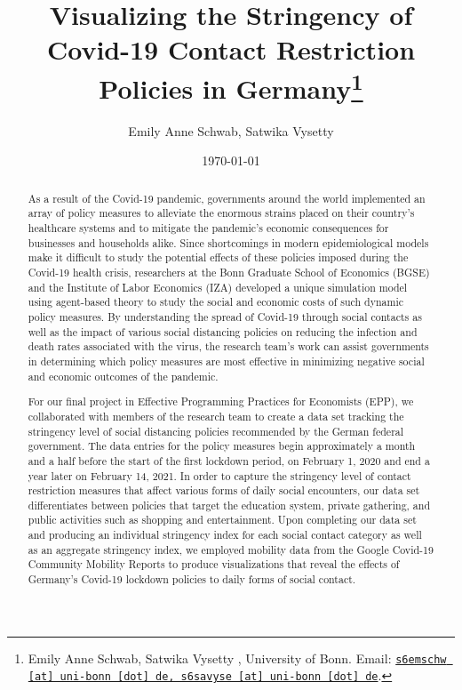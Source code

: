 \documentclass[11pt, a4paper, leqno]{article}
\begin{document}
\title{\bf{Visualizing the Stringency of Covid-19 Contact Restriction Policies in Germany}\thanks{Emily Anne Schwab, Satwika Vysetty , University of Bonn. Email: \href{mailto:s6emschw@uni-bonn.de, s6savyse@uni-bonn.de}{\nolinkurl{s6emschw [at] uni-bonn [dot] de, s6savyse [at] uni-bonn [dot] de}}.}}

\author{Emily Anne Schwab, Satwika Vysetty}

\date{
    \today
}

\maketitle


\clearpage

\begin{abstract}
\noindent As a result of the Covid-19 pandemic, governments around the world implemented an array of policy measures to alleviate the enormous strains placed on their country’s healthcare systems and to mitigate the pandemic’s economic consequences for businesses and households alike. Since shortcomings in modern epidemiological models make it difficult to study the potential effects of these policies imposed during the Covid-19 health crisis, researchers at the Bonn Graduate School of Economics (BGSE) and the Institute of Labor Economics (IZA) developed a unique simulation model using agent-based theory to study the social and economic costs of such dynamic policy measures. By understanding the spread of Covid-19 through social contacts as well as the impact of various social distancing policies on reducing the infection and death rates associated with the virus, the research team’s work can assist governments in determining which policy measures are most effective in minimizing negative social and economic outcomes of the pandemic.

\vspace{6pt}

\noindent For our final project in Effective Programming Practices for Economists (EPP), we collaborated with members of the research team to create a data set tracking the stringency level of social distancing policies recommended by the German federal government. The data entries for the policy measures begin approximately a month and a half before the start of the first lockdown period, on February 1, 2020 and end a year later on February 14, 2021. In order to capture the stringency level of contact restriction measures that affect various forms of daily social encounters, our data set differentiates between policies that target the education system, private gathering, and public activities such as shopping and entertainment. Upon completing our data set and producing an individual stringency index for each social contact category as well as an aggregate stringency index, we employed mobility data from the Google Covid-19 Community Mobility Reports to produce visualizations that reveal the effects of Germany’s Covid-19 lockdown policies to daily forms of social contact.
\end{abstract}
\clearpage
\end{document}

